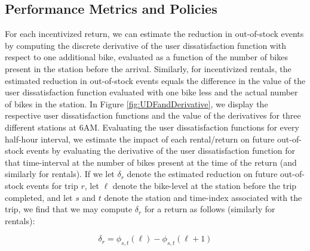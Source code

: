 
\subsection{Performance Metrics and Policies}

For each incentivized return, we can estimate the reduction in out-of-stock events by computing the discrete derivative of the user dissatisfaction function with respect to one additional bike, evaluated  as a function of the number of bikes present in the station before the arrival. Similarly, for incentivized rentals, the estimated reduction in out-of-stock events equals the difference in the value of the user dissatisfaction function evaluated with one bike less and the actual number of bikes in the station.  In Figure \ref{fig:UDFandDerivative}, we display the respective user dissatisfaction functions and the value of the derivatives for three different stations at 6AM. Evaluating the user dissatisfaction functions for every half-hour interval, we estimate the impact of each rental/return on future out-of-stock events by evaluating the derivative of the user dissatisfaction function for that time-interval at the number of bikes present at the time of the return (and similarly for rentals). If we let $\delta_r$ denote the estimated reduction on future out-of-stock events for trip $r$,  let $\ell$ denote the bike-level at the station before the trip completed, and let $s$ and $t$ denote the station and time-index associated with the trip, we find that we may compute $\delta_r$ for a return as follows (similarly for rentals):

\begin{equation}
\delta_r = \phi_{s, t} (\ell) - \phi_{s, t} (\ell + 1)
\end{equation}


